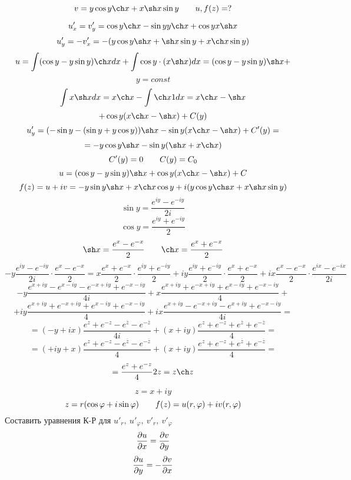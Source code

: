 \documentclass[12pt, fleqn]{article}
\begin{document}
\begin{lect}
   \begin{Task}[2]
       \[v = y\cos y \ch x + x\sh x \sin y \qq u, f(z) = ?\]

       \[u'_x = v'_y = \cos y \ch x - \sin y y \ch x + \cos y x \sh x\]
       \[u'_y = -v'_x = -(y\cos y \sh x + \sh x \sin y + x\ch x \sin y)\]
       \[u = \int (\cos y - y\sin y) \ch x dx + \int \cos y \cdot (x\sh x)dx = (\cos y - y\sin y)\sh x + \]
       \[y = const\]
       \[\int x\sh x dx = x\ch x - \int \ch x 1 dx = x\ch x - \sh x\]
       \[+ \cos y(x\ch x - \sh x) + C(y)\]
       \[u'_y = (-\sin y -(\sin y + y\cos y)) \sh x - \sin y (x\ch x - \sh x) + C'(y) = \]
       \[= -y\cos y \sh x -\sin y (\sh x + x\ch x)\]
       \[C'(y) = 0 \qquad C(y) = C_0\]
       \[u = (\cos y - y\sin y)\sh x  + \cos y (x\ch x - \sh x) + C\]
       \[f(z) = u + iv = -y\sin y \sh x + x\ch x \cos y + 
       i(y\cos y \chs x + x\sh x \sin y)\]
       \[\sin y = \frac{e^{iy} - e^{-iy}  }{2i}\]
       \[\cos y = \frac{e^{iy} + e^{-iy}  }{2}\]
       \[\sh x = \frac{e^{x} - e^{-x}  }{2} \qq \ch x = \frac{e^x + e^{-x} }{2}\]
       \[-y \frac{e^{iy} - e^{-iy}  }{2i} \cdot \frac{e^x - e^{-x} }{2 } = x \frac{e^x + e^{-x}}{2} 
       \cdot \frac{e^{iy} + e^{-iy}  }{2} + iy \frac{e^{iy} + e^{-iy} }{2} \cdot 
        \frac{e^x + e^{-x} }{2} + ix \frac{e^x - e^{-x} }{2} \cdot \frac{e^{ix} - e^{-ix}  }{2i}\]
        \[-y \frac{e^{x + iy} - e^{x - iy}  - e^{-x + iy} + e^{-x -iy}   }{4i} + 
        x\frac{e^{x + iy} + e^{-x + iy} + e^{x - iy} + e^{-x - iy}    }{4} + \]
        \[+ iy \frac{e^{x + iy} + e^{-x + iy} + e^{x - iy} + e^{-x - iy}   }{4} + 
        ix \frac{e^{x + iy} - e^{-x + iy} - e^{x + iy} + e^{-x - iy}    }{4i} = \]
        \[= (-y + ix) \frac{e^z + e^{-z} - e^{\overline{z}} - e^{-\overline{z}}   }{4i} + 
        (x + iy) \frac{e^z  +e^{-z} + e^{\overline{z}} + e^{-\overline{z}}   }{4} = \]
        \[= (+iy + x) \frac{e^z + e^{-z} - e^{\overline{z}} - e^{-\overline{z}}   }{4} + 
         (x + iy) \frac{e^z  +e^{-z} + e^{\overline{z}} + e^{-\overline{z}}   }{4} =\]
         \[= \frac{e^z + e^{-z} }{4} 2z = z \ch z\]
   \end{Task}

   \begin{Task}[3]
       \[z = x + iy\]
       \[z = r(\cos \varphi + i\sin \varphi) \qquad f(z) = u(r, \varphi) + iv(r, \varphi)\]
       Составить уравнения К-Р для $u'_r, \ u'_\varphi, \ v'_r, \ v'_\varphi$
       \[\frac{\partial u}{\partial x} = \frac{\partial v}{\partial y}\]
       \[\frac{\partial u}{\partial y} = -\frac{\partial v}{\partial x}\]


\end{Task}
\end{lect}
\end{document}
